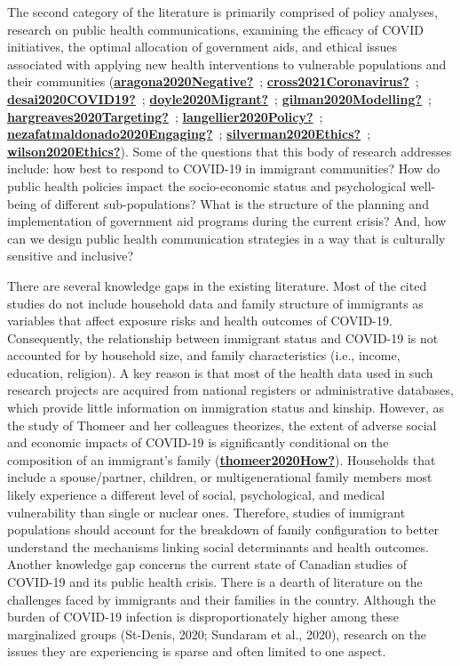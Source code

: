 \documentclass[
]{article}
\begin{document}
The second category of the literature is primarily comprised of policy analyses,
research on public health communications, examining the efficacy of COVID
initiatives, the optimal allocation of government aids, and ethical issues
associated with applying new health interventions to vulnerable populations and
their communities (\protect\hyperlink{ref-aragona2020Negative}{\textbf{aragona2020Negative?}}~; \protect\hyperlink{ref-cross2021Coronavirus}{\textbf{cross2021Coronavirus?}}~; \protect\hyperlink{ref-desai2020COVID19}{\textbf{desai2020COVID19?}}~; \protect\hyperlink{ref-doyle2020Migrant}{\textbf{doyle2020Migrant?}}~; \protect\hyperlink{ref-gilman2020Modelling}{\textbf{gilman2020Modelling?}}~; \protect\hyperlink{ref-hargreaves2020Targeting}{\textbf{hargreaves2020Targeting?}}~; \protect\hyperlink{ref-langellier2020Policy}{\textbf{langellier2020Policy?}}~; \protect\hyperlink{ref-nezafatmaldonado2020Engaging}{\textbf{nezafatmaldonado2020Engaging?}}~; \protect\hyperlink{ref-silverman2020Ethics}{\textbf{silverman2020Ethics?}}~; \protect\hyperlink{ref-wilson2020Ethics}{\textbf{wilson2020Ethics?}}). Some of the questions that this body
of research addresses include: how best to respond to COVID-19 in immigrant
communities? How do public health policies impact the socio-economic status and
psychological well-being of different sub-populations? What is the structure of
the planning and implementation of government aid programs during the current
crisis? And, how can we design public health communication strategies in a way
that is culturally sensitive and inclusive?

There are several knowledge gaps in the existing literature. Most of the cited
studies do not include household data and family structure of immigrants as
variables that affect exposure risks and health outcomes of COVID-19.
Consequently, the relationship between immigrant status and COVID-19 is not
accounted for by household size, and family characteristics (i.e., income,
education, religion). A key reason is that most of the health data used in such
research projects are acquired from national registers or administrative
databases, which provide little information on immigration status and kinship.
However, as the study of Thomeer and her colleagues theorizes, the extent of
adverse social and economic impacts of COVID-19 is significantly conditional on
the composition of an immigrant's family (\protect\hyperlink{ref-thomeer2020How}{\textbf{thomeer2020How?}}). Households that
include a spouse/partner, children, or multigenerational family members most
likely experience a different level of social, psychological, and medical
vulnerability than single or nuclear ones. Therefore, studies of immigrant
populations should account for the breakdown of family configuration to better
understand the mechanisms linking social determinants and health outcomes.
Another knowledge gap concerns the current state of Canadian studies of COVID-19
and its public health crisis. There is a dearth of literature on the challenges
faced by immigrants and their families in the country. Although the burden of
COVID-19 infection is disproportionately higher among these marginalized groups
(St-Denis, 2020; Sundaram et al., 2020), research on the issues they are
experiencing is sparse and often limited to one aspect.
\end{document}
